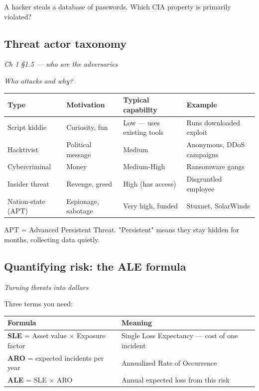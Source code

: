 \documentclass[12pt,openany]{book}
\begin{document}
A hacker steals a database of passwords. Which CIA property is primarily violated?

\medskip

\subsection*{Threat actor taxonomy}
{\small\itshape\color{gray}Ch 1 §1.5 --- who are the adversaries}

{\small\itshape\color{gray}Who attacks and why?}

\begin{center}\small\begin{tabular}{p{3.2cm}p{3.2cm}p{3.2cm}p{3.2cm}}\toprule
\textbf{Type} & \textbf{Motivation} & \textbf{Typical capability} & \textbf{Example} \\ \midrule
Script kiddie & Curiosity, fun & Low --- uses existing tools & Runs downloaded exploit \\
Hacktivist & Political message & Medium & Anonymous, DDoS campaigns \\
Cybercriminal & Money & Medium-High & Ransomware gangs \\
Insider threat & Revenge, greed & High (has access) & Disgruntled employee \\
Nation-state (APT) & Espionage, sabotage & Very high, funded & Stuxnet, SolarWinds \\
\bottomrule\end{tabular}\end{center}


APT = Advanced Persistent Threat. "Persistent" means they stay hidden for months, collecting data quietly.

\medskip

\subsection*{Quantifying risk: the ALE formula}
{\small\itshape\color{gray}Turning threats into dollars}

Three terms you need:


\begin{center}\small\begin{tabular}{p{6.5cm}p{6.5cm}}\toprule
\textbf{Formula} & \textbf{Meaning} \\ \midrule
\textbf{SLE} = Asset value $\times$ Exposure factor & Single Loss Expectancy --- cost of one incident \\
\textbf{ARO} = expected incidents per year & Annualized Rate of Occurrence \\
\textbf{ALE} = SLE $\times$ ARO & Annual expected loss from this risk \\
\bottomrule\end{tabular}\end{center}
\end{document}
